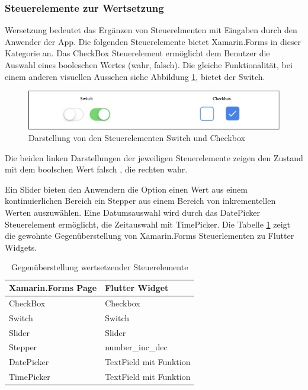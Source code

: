  \begin{minipage}{\linewidth}

\end{minipage}

\subsubsection{Steuerelemente zur Wertsetzung}
Wersetzung bedeutet das Ergänzen von Steuerelmenten mit Eingaben durch den Anwender der App.  Die folgenden Steuerelemente bietet Xamarin.Forms in dieser Kategorie an.  Das \glq CheckBox\grq{}  Steuerelement ermöglicht dem Benutzer die Auswahl eines boole­schen Wertes (wahr, falsch).  Die gleiche Funktionalität, bei einem anderen visuellen Aussehen siehe Abbildung  \ref{fig:SwitchCheckbox},  bietet der \glq Switch\grq{}.  

\begin{figure}[!ht]
 \includegraphics[width=\textwidth,height=\textheight,keepaspectratio]{Images/CrossPlattformFrameworks/SwitchTextBox.png}
 \caption{Darstellung von den Steuerelementen \glq Switch\grq{} und \glq Checkbox\grq{}}
 \label{fig:SwitchCheckbox}
\end{figure}
Die beiden linken Darstellungen der jeweiligen Steuerelemente zeigen den Zustand mit dem boolschen Wert falsch , die rechten wahr.

Ein  \glq Slider\grq{}  bieten den Anwendern die Option einen Wert aus einem kontinuierlichen Bereich ein \glq Stepper\grq{}  aus einem Bereich von inkrementellen Werten auszuwählen.  Eine Datumsauswahl wird durch das \glq DatePicker \grq{} Steuerelement ermöglicht,  die Zeitauswahl mit \glq TimePicker\grq{}.  Die Tabelle \ref{tab:valuecontrols} zeigt die gewohnte Gegenüberstellung von Xamarin.Forms Steuerlementen zu Flutter Widgets. 

\begin{table}[!ht]
\begin{tabularx}{\textwidth}{X|X}
   \textbf{Xamarin.Forms Page} & \textbf{Flutter Widget}  \\
\hline
	CheckBox		       				&  Checkbox	 		\\ 
	Switch		       					&  Switch	 		\\ 
	Slider		       					&  Slider	 		\\ 
	Stepper		       				&  number\_inc\_dec	 		\\ 
	DatePicker		       			&  TextField mit Funktion		\\ 
	TimePicker		       			&  TextField mit Funktion	 		\\ 
\end{tabularx}
\caption{Gegenüberstellung wertsetzender Steuerelemente}
 \label{tab:valuecontrols}
\end{table}
 
